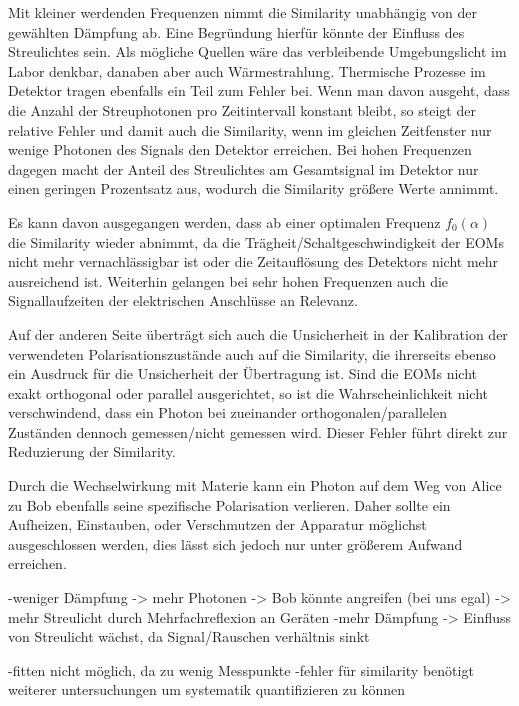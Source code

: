 Mit kleiner werdenden Frequenzen nimmt die Similarity unabhängig von der
gewählten Dämpfung ab. Eine Begründung hierfür könnte der Einfluss des
Streulichtes sein. Als mögliche Quellen wäre das verbleibende Umgebungslicht 
im Labor denkbar, danaben aber auch Wärmestrahlung. Thermische Prozesse im
Detektor tragen ebenfalls ein Teil zum Fehler bei.
Wenn man davon ausgeht, dass die Anzahl der Streuphotonen pro
Zeitintervall konstant bleibt, so steigt der relative Fehler und damit auch die
Similarity, wenn im gleichen Zeitfenster nur wenige Photonen des Signals den
Detektor erreichen. Bei hohen Frequenzen dagegen macht der Anteil des
Streulichtes am Gesamtsignal im Detektor nur einen geringen Prozentsatz aus,
wodurch die Similarity größere Werte annimmt.

Es kann davon ausgegangen werden, dass ab einer optimalen Frequenz $f_0(α)$ die
Similarity wieder abnimmt, da die Trägheit/Schaltgeschwindigkeit der EOMs nicht
mehr vernachlässigbar ist oder die Zeitauflösung des Detektors nicht mehr
ausreichend ist. Weiterhin gelangen bei sehr hohen Frequenzen auch die Signallaufzeiten
der elektrischen Anschlüsse an Relevanz.

Auf der anderen Seite überträgt sich auch die Unsicherheit in der Kalibration
der verwendeten Polarisationszustände auch auf die Similarity, die ihrerseits
ebenso ein Ausdruck für die Unsicherheit der Übertragung ist. Sind die
EOMs nicht exakt orthogonal oder parallel ausgerichtet, so ist die
Wahrscheinlichkeit nicht verschwindend, dass ein Photon bei zueinander
orthogonalen/parallelen Zuständen dennoch gemessen/nicht gemessen wird. Dieser
Fehler führt direkt zur Reduzierung der Similarity.

Durch die Wechselwirkung mit Materie kann ein Photon auf dem Weg von Alice zu
Bob ebenfalls seine spezifische Polarisation verlieren. Daher sollte ein Aufheizen,
Einstauben, oder Verschmutzen der Apparatur möglichst ausgeschlossen werden, dies
lässt sich jedoch nur unter größerem Aufwand erreichen.

-weniger Dämpfung -> mehr Photonen -> Bob könnte angreifen (bei uns egal)
                                   -> mehr Streulicht durch Mehrfachreflexion an Geräten
-mehr Dämpfung -> Einfluss von Streulicht wächst, da Signal/Rauschen verhältnis sinkt

-fitten nicht möglich, da zu wenig Messpunkte
-fehler für similarity benötigt weiterer untersuchungen um systematik quantifizieren
zu können
